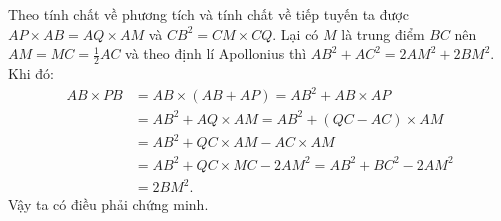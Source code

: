 \begin{ex}
{\begin{center}
\end{center}
Theo tính chất về phương tích và tính chất về tiếp tuyến ta được $AP\times AB=AQ\times AM$ và $CB^2=CM\times CQ$. Lại có $M$ là trung điểm $BC$ nên $AM=MC=\frac{1}{2}AC$ và theo định lí Apollonius thì $AB^2+AC^2=2AM^2+2BM^2$. Khi đó: 
	{\allowdisplaybreaks
	\begin{align*}
		AB\times PB &= AB\times (AB+AP)=AB^2+AB\times AP\\
		&= AB^2+AQ\times AM = AB^2+(QC-AC)\times AM\\
		&= AB^2+QC\times AM-AC\times AM\\
		&= AB^2+QC\times MC-2AM^2=AB^2+BC^2-2AM^2\\
		&= 2BM^2.
	\end{align*}}
Vậy ta có điều phải chứng minh.
}
\end{ex}  
  
